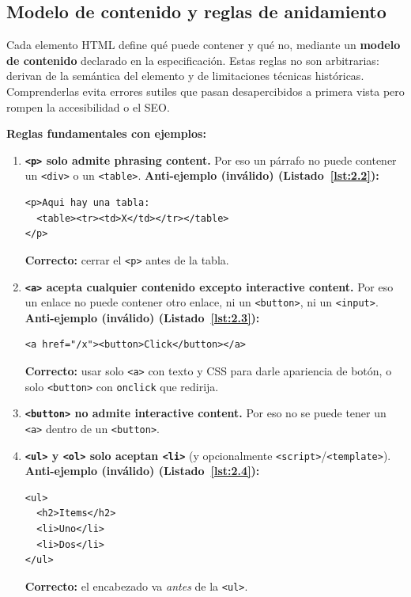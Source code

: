 \documentclass[11pt,a4paper,openany]{book}
\begin{document}
\subsection{Modelo de contenido y reglas de anidamiento}

Cada elemento HTML define qué puede contener y qué no, mediante un
\textbf{modelo de contenido} declarado en la especificación. Estas
reglas no son arbitrarias: derivan de la semántica del elemento y de
limitaciones técnicas históricas. Comprenderlas evita errores
sutiles que pasan desapercibidos a primera vista pero rompen la
accesibilidad o el SEO.

\textbf{Reglas fundamentales con ejemplos:}

\begin{enumerate}
\item \textbf{\texttt{<p>} solo admite phrasing content.} Por eso un
párrafo no puede contener un \texttt{<div>} o un \texttt{<table>}.
\textbf{Anti-ejemplo (inválido) (Listado~\ref{lst:2.2}):}
\begin{lstlisting}[style=html,numbers=none,caption={Ejemplo de HTML},label=lst:2.2]
<p>Aqui hay una tabla:
  <table><tr><td>X</td></tr></table>
</p>
\end{lstlisting}
\textbf{Correcto:} cerrar el \texttt{<p>} antes de la tabla.

\item \textbf{\texttt{<a>} acepta cualquier contenido excepto
interactive content.} Por eso un enlace no puede contener otro
enlace, ni un \texttt{<button>}, ni un \texttt{<input>}.
\textbf{Anti-ejemplo (inválido) (Listado~\ref{lst:2.3}):}
\begin{lstlisting}[style=html,numbers=none,caption={Ejemplo de HTML},label=lst:2.3]
<a href="/x"><button>Click</button></a>
\end{lstlisting}
\textbf{Correcto:} usar solo \texttt{<a>} con texto y CSS para
darle apariencia de botón, o solo \texttt{<button>} con
\texttt{onclick} que redirija.

\item \textbf{\texttt{<button>} no admite interactive content.} Por
eso no se puede tener un \texttt{<a>} dentro de un \texttt{<button>}.

\item \textbf{\texttt{<ul>} y \texttt{<ol>} solo aceptan
\texttt{<li>}} (y opcionalmente \texttt{<script>}/\texttt{<template>}).
\textbf{Anti-ejemplo (inválido) (Listado~\ref{lst:2.4}):}
\begin{lstlisting}[style=html,numbers=none,caption={Ejemplo de HTML},label=lst:2.4]
<ul>
  <h2>Items</h2>
  <li>Uno</li>
  <li>Dos</li>
</ul>
\end{lstlisting}
\textbf{Correcto:} el encabezado va \emph{antes} de la \texttt{<ul>}.


\end{enumerate}
\end{document}
